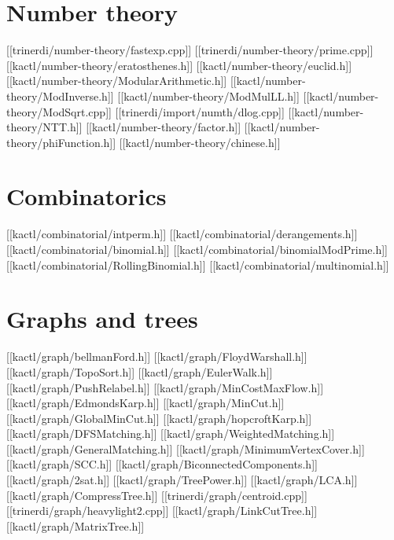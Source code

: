 \chapter{Number theory}
[[trinerdi/number-theory/fastexp.cpp]]
[[trinerdi/number-theory/prime.cpp]]
[[kactl/number-theory/eratosthenes.h]]
[[kactl/number-theory/euclid.h]]
[[kactl/number-theory/ModularArithmetic.h]]
[[kactl/number-theory/ModInverse.h]]
[[kactl/number-theory/ModMulLL.h]]
[[kactl/number-theory/ModSqrt.cpp]]
[[trinerdi/import/numth/dlog.cpp]]
[[kactl/number-theory/NTT.h]]
[[kactl/number-theory/factor.h]]
[[kactl/number-theory/phiFunction.h]]
[[kactl/number-theory/chinese.h]]

\chapter{Combinatorics}

[[kactl/combinatorial/intperm.h]]
[[kactl/combinatorial/derangements.h]]
[[kactl/combinatorial/binomial.h]]
[[kactl/combinatorial/binomialModPrime.h]]
[[kactl/combinatorial/RollingBinomial.h]]
[[kactl/combinatorial/multinomial.h]]

\chapter{Graphs and trees}

[[kactl/graph/bellmanFord.h]]
[[kactl/graph/FloydWarshall.h]]
[[kactl/graph/TopoSort.h]]
[[kactl/graph/EulerWalk.h]]
[[kactl/graph/PushRelabel.h]]
[[kactl/graph/MinCostMaxFlow.h]]
[[kactl/graph/EdmondsKarp.h]]
[[kactl/graph/MinCut.h]]
[[kactl/graph/GlobalMinCut.h]]
[[kactl/graph/hopcroftKarp.h]]
[[kactl/graph/DFSMatching.h]]
[[kactl/graph/WeightedMatching.h]]
[[kactl/graph/GeneralMatching.h]]
[[kactl/graph/MinimumVertexCover.h]]
[[kactl/graph/SCC.h]]
[[kactl/graph/BiconnectedComponents.h]]
[[kactl/graph/2sat.h]]
[[kactl/graph/TreePower.h]]
[[kactl/graph/LCA.h]]
[[kactl/graph/CompressTree.h]]
[[trinerdi/graph/centroid.cpp]]
[[trinerdi/graph/heavylight2.cpp]]
[[kactl/graph/LinkCutTree.h]]
[[kactl/graph/MatrixTree.h]]

